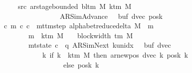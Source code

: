\begin{isabellebody}
\ \ \ \ \ \ \ src{}{\isacharcolon}{\kern0pt}\ {\isachardoublequoteopen}ar{\isacharunderscore}{\kern0pt}stage{\isacharunderscore}{\kern0pt}bounded\ {\isacharparenleft}{\kern0pt}bl{\isacharunderscore}{\kern0pt}tm\ M{\isacharparenright}{\kern0pt}\ {\isacharparenleft}{\kern0pt}k{\isacharunderscore}{\kern0pt}tm\ M{\isacharparenright}{\kern0pt}\isanewline
\ \ \ \ \ \ \ \ \ \ \ \ \ \ \ \ \ \ \ {\isacharparenleft}{\kern0pt}AR{\isacharunderscore}{\kern0pt}SimAdvance{\isacharcomma}{\kern0pt}\ {}{\isacharcomma}{\kern0pt}\ {}{\isacharcomma}{\kern0pt}\ buf{}{\isacharcomma}{\kern0pt}\ dvec{\isacharcomma}{\kern0pt}\ posk{}{\isacharparenright}{\kern0pt}{\isachardoublequoteclose}\isanewline
\ \ \ {\isachardoublequoteopen}{\isasymexists}c\ m{\isachardot}{\kern0pt}\ {\isacharparenleft}{\kern0pt}c{}{\isacharcomma}{\kern0pt}\ c{\isacharparenright}{\kern0pt}\ {\isasymin}\ {\isacharparenleft}{\kern0pt}mttm{\isacharunderscore}{\kern0pt}step\ {\isacharparenleft}{\kern0pt}alphabet{\isacharunderscore}{\kern0pt}reduce{\isacharunderscore}{\kern0pt}delta\ M{\isacharparenright}{\kern0pt}{\isacharparenright}{\kern0pt}\ {\isacharcircum}{\kern0pt}{\isacharcircum}{\kern0pt}\ m\isanewline
\ \ \ \ \ \ \ \ \ {\isasymand}\ m\ {\isasymle}\ k{\isacharunderscore}{\kern0pt}tm\ M\ {\isacharasterisk}{\kern0pt}\ {\isacharparenleft}{\kern0pt}{}\ {\isacharasterisk}{\kern0pt}\ block{\isacharunderscore}{\kern0pt}width\ {\isacharparenleft}{\kern0pt}{\isasymGamma}{\isacharunderscore}{\kern0pt}tm\ M{\isacharparenright}{\kern0pt}{\isacharparenright}{\kern0pt}\isanewline
\ \ \ \ \ \ \ \ \ {\isasymand}\ mt{\isacharunderscore}{\kern0pt}state\ c\ {\isacharequal}{\kern0pt}\ {\isacharparenleft}{\kern0pt}q{\isacharcomma}{\kern0pt}\ AR{\isacharunderscore}{\kern0pt}SimNext{\isacharcomma}{\kern0pt}\ k{\isacharunderscore}{\kern0pt}unidx\ {}{\isacharcomma}{\kern0pt}\ {}{\isacharcomma}{\kern0pt}\ buf{}{\isacharcomma}{\kern0pt}\ dvec{\isacharcomma}{\kern0pt}\isanewline
\ \ \ \ \ \ \ \ \ \ \ \ \ \ {\isacharparenleft}{\kern0pt}{\isasymlambda}k{\isachardot}{\kern0pt}\ if\ k\ {\isacharless}{\kern0pt}\ k{\isacharunderscore}{\kern0pt}tm\ M\ then\ ar{\isacharunderscore}{\kern0pt}newpos\ {\isacharparenleft}{\kern0pt}dvec\ k{\isacharparenright}{\kern0pt}\ {\isacharparenleft}{\kern0pt}posk{}\ k{\isacharparenright}{\kern0pt}\isanewline
\ \ \ \ \ \ \ \ \ \ \ \ \ \ \ \ \ \ \ \ else\ posk{}\ k{\isacharparenright}{\kern0pt}{\isacharparenright}{\kern0pt}\isanewline

\end{isabellebody}
